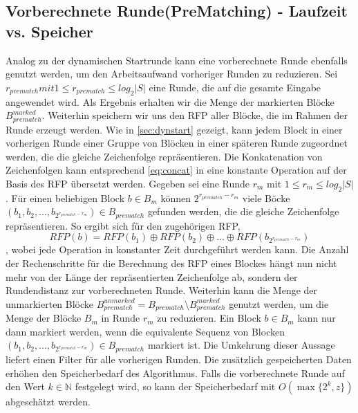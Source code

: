 \subsection{Vorberechnete Runde(PreMatching) - Laufzeit vs. Speicher}
Analog zu der dynamischen Startrunde kann eine vorberechnete Runde ebenfalls genutzt werden, um den Arbeitsaufwand vorheriger Runden zu reduzieren. Sei $r_{prematch} mit 
1\leq r_{prematch} \leq log_2{|S|}$ eine Runde, die auf die gesamte Eingabe angewendet wird. Als Ergebnis erhalten wir die Menge der markierten Blöcke $B_{prematch}^{marked}$.
Weiterhin speichern wir uns den RFP aller Blöcke, die im Rahmen der Runde erzeugt werden. Wie in \ref{sec:dynstart} gezeigt, kann jedem Block in einer vorherigen Runde einer Gruppe
von Blöcken in einer späteren Runde zugeordnet werden, die die gleiche Zeichenfolge repräsentieren. Die Konkatenation von Zeichenfolgen kann entsprechend \ref{eq:concat} in eine
konstante Operation auf der Basis des RFP übersetzt werden. Gegeben sei eine Runde $r_m$ mit $1\leq r_m \leq log_2{|S|}$. Für einen beliebigen Block $b \in B_m$ können $2^{r_{prematch}-r_m}$
viele Böcke $(b_1, b_2, ..., b_{2^{r_{prematch}-r_m}})\in B_{prematch}$ gefunden werden, die die gleiche Zeichenfolge repräsentieren. So ergibt sich für den zugehörigen RFP,
\begin{equation}
    RFP(b) = RFP(b_1) \oplus RFP(b_2) \oplus ... \oplus RFP(b_{2^{r_{prematch}-r_m}})
\end{equation}
, wobei jede Operation in konstanter Zeit durchgeführt werden kann. Die Anzahl der Rechenschritte für die Berechnung des RFP eines Blockes hängt nun nicht mehr von der Länge der
repräsentierten Zeichenfolge ab, sondern der Rundendistanz zur vorberechneten Runde.
Weiterhin kann die Menge der unmarkierten Blöcke $B_{prematch}^{unmarked}=B_{prematch}\setminus B_{prematch}^{marked}$ genutzt werden, um die Menge der Blöcke $B_m$ in Runde $r_m$
zu reduzieren. Ein Block $b \in B_m$ kann nur dann markiert werden, wenn die equivalente Sequenz von Blocken $(b_1, b_2, ..., b_{2^{r_{prematch}-r_m}})\in B_{prematch}$ markiert ist.
Die Umkehrung dieser Aussage liefert einen Filter für alle vorherigen Runden. Die zusätzlich gespeicherten Daten erhöhen den Speicherbedarf des Algorithmus. Falls die vorberechnete
Runde auf den Wert $k\in \mathbb{N}$ festgelegt wird, so kann der Speicherbedarf mit $O(\max\{2^k, z\})$ abgeschätzt werden.

